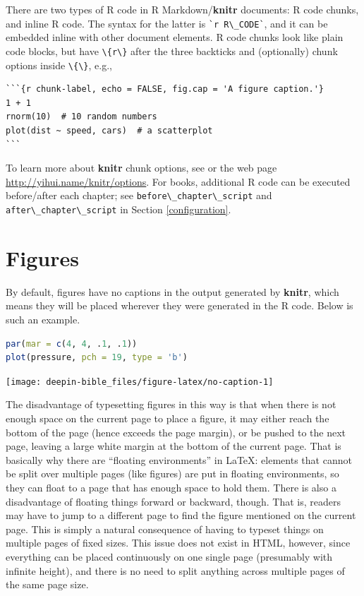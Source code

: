 \documentclass[doctor,openright,twoside]{sjtuthesis}
\newcommand{\passthrough}[1]{#1}
\theoremstyle{plain}
\theoremstyle{definition}
\theoremstyle{remark}
\theoremstyle{ocrenumbox}
\theoremstyle{plain}
\begin{document}
There are two types of R code in R Markdown/\textbf{knitr} documents: R
code chunks, and inline R code.
The syntax for the latter is \passthrough{\lstinline!`r R\_CODE`!}, and
it can be embedded inline with other document elements. R code chunks
look like plain code blocks, but have \passthrough{\lstinline!\{r\}!}
after the three backticks and (optionally) chunk options inside
\passthrough{\lstinline!\{\}!}, e.g.,

\begin{lstlisting}
```{r chunk-label, echo = FALSE, fig.cap = 'A figure caption.'}
1 + 1
rnorm(10)  # 10 random numbers
plot(dist ~ speed, cars)  # a scatterplot
```
\end{lstlisting}

To learn more about \textbf{knitr} chunk options, see \textcite{xie2015}
or the web page \url{http://yihui.name/knitr/options}. For books,
additional R code can be executed before/after each chapter; see
\passthrough{\lstinline!before\_chapter\_script!} and
\passthrough{\lstinline!after\_chapter\_script!} in Section
\ref{configuration}.

\hypertarget{figures}{%
\section{Figures}\label{figures}}

By default, figures have no captions in the output
generated by \textbf{knitr}, which means they will be placed wherever
they were generated in the R code. Below is such an example.

\begin{lstlisting}[language=R]
par(mar = c(4, 4, .1, .1))
plot(pressure, pch = 19, type = 'b')
\end{lstlisting}

\texttt{[image: deepin-bible\_files/figure-latex/no-caption-1]}

The disadvantage of typesetting figures in this way is that when there
is not enough space on the current page to place a figure, it may either
reach the bottom of the page (hence exceeds the page margin), or be
pushed to the next page, leaving a large white margin at the bottom of
the current page. That is basically why there are ``floating
environments'' in LaTeX: elements that
cannot be split over multiple pages (like figures) are put in floating
environments, so they can float to a page that has enough space to hold
them. There is also a disadvantage of floating things forward or
backward, though. That is, readers may have to jump to a different page
to find the figure mentioned on the current page. This is simply a
natural consequence of having to typeset things on multiple pages of
fixed sizes. This issue does not exist in HTML, however, since
everything can be placed continuously on one single page (presumably
with infinite height), and there is no need to split anything across
multiple pages of the same page size.
\end{document}
